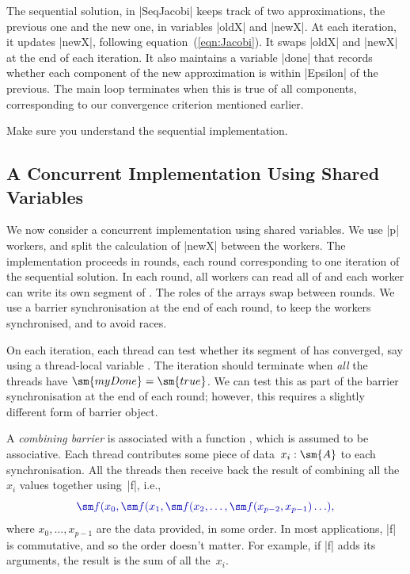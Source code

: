 The sequential solution, in |SeqJacobi| keeps track of two approximations, the
previous one and the new one, in variables |oldX| and |newX|.  At each
iteration, it updates |newX|, following equation~(\ref{eqn:Jacobi}).  It swaps
|oldX| and |newX| at the end of each iteration.  It also maintains a variable
|done| that records whether each component of the new approximation is within
|Epsilon| of the previous.  The main loop terminates when this is true of all
components, corresponding to our convergence criterion mentioned earlier. 

\begin{instruction}
Make sure you understand the sequential implementation.
\end{instruction}


\subsection{A Concurrent Implementation Using Shared Variables}

We now consider a concurrent implementation using shared variables.  We 
use |p| workers, and split the calculation of |newX| between the workers.  The
implementation proceeds in rounds, each round corresponding to one iteration
of the sequential solution.  In each round, all workers can read all of
 and each worker can write its own segment of .  The
roles of the arrays swap between rounds.  We use a barrier synchronisation at
the end of each round, to keep the workers synchronised, and to avoid races.

On each iteration, each thread can test whether its segment of  has
converged, say using a thread-local variable .  The iteration
should terminate when \emph{all} the threads have $\sm{myDone} = \sm{true}$.
We can test this as part of the barrier synchronisation at the end of each
round; however, this requires a slightly different form of barrier object.  

A \emph{combining barrier} is associated with a
function , which is assumed to be associative.  Each
thread contributes some piece of data~$x_i: \sm{A}$ to each synchronisation.
All the threads then receive back the result of combining all the $x_i$ values
together using~|f|, i.e.,
\[\mstyle
\sm f(x_0, \sm f(x_1, \sm f(x_2, \ldots, \sm f(x_{p-2}, x_{p-1})\ldots),
\]
where $x_0, \ldots, x_{p-1}$ are the data provided, in some order.  In most
applications, |f| is commutative, and so the order doesn't matter.  For
example, if |f| adds its arguments, the result is the sum of all the~$x_i$.

